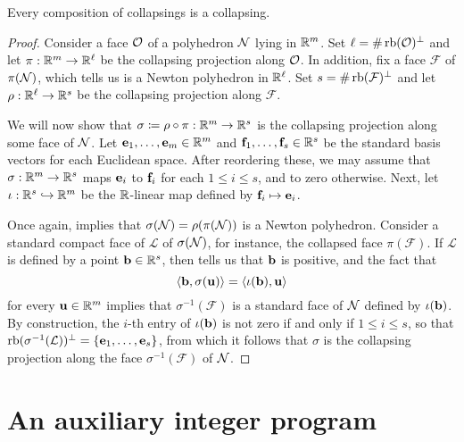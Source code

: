 \documentclass{amsart}
\begin{document}
\begin{proposition}
\label{collapse of a collapse is a collapse: P} Every composition of collapsings is a collapsing.
\end{proposition}

\begin{proof}
Consider a face $\mathcal{O}$ of a polyhedron $\mathcal{N}$ lying in $\mathbb{R}^m$.   Set $\ell = \# \operatorname{rb}(\mathcal{O})^{\perp}$ and let $\pi: \mathbb{R}^m \to \mathbb{R}^{\ell}$ be the collapsing projection along $\mathcal{O}$.  In addition, fix a face $\mathcal{F}$ of $\pi(\mathcal{N})$,  which  tells us is a Newton polyhedron in $\mathbb{R}^{\ell}$.  Set $s=\# \operatorname{rb}(\mathcal{F})^{\perp}$ and let $\rho: \mathbb{R}^{\ell} \to \mathbb{R}^s$ be the collapsing projection along $\mathcal{F}$.

We will now show that $\sigma \coloneqq \rho \circ \pi: \mathbb{R}^m \to \mathbb{R}^s$ is the collapsing projection along some face of $\mathcal{N}$.  Let $\mathbf{e}_1, \ldots, \mathbf{e}_m \in \mathbb{R}^m$ and $\mathbf{f}_1, \ldots, \mathbf{f}_s \in \mathbb{R}^s$ be the standard basis vectors for each Euclidean space.  After reordering these, we may assume that $\sigma: \mathbb{R}^m \to \mathbb{R}^s$ maps $\mathbf{e}_i$ to $\mathbf{f}_i$ for each $1 \leq i \leq s$, and to zero otherwise.   Next, let  $\iota:  \mathbb{R}^s \hookrightarrow \mathbb{R}^m$ be the $\mathbb{R}$-linear map defined by $\mathbf{f}_i \mapsto \mathbf{e}_i$.

Once again,  implies that $\sigma(\mathcal{N}) = \rho(\pi(\mathcal{N}))$ is a Newton polyhedron.  Consider a standard compact face of $\mathcal{L}$ of $\sigma(\mathcal{N})$, for instance, the collapsed face $\pi(\mathcal{F})$.    If $\mathcal{L}$ is defined by a point $\mathbf{b} \in \mathbb{R}^s$, then   tells us that $\mathbf{b}$ is positive, and the fact that
\[ \langle \mathbf{b}, \sigma(\mathbf{u}) \rangle = \langle \iota(\mathbf{b}), \mathbf{u} \rangle \] for every $\mathbf{u} \in \mathbb{R}^m$ implies that $\sigma^{-1}(\mathcal{F})$ is a standard face of $\mathcal{N}$ defined by $\iota(\mathbf{b})$.  By construction, the $i$-th entry of $\iota(\mathbf{b})$ is not zero if and only if $1 \leq i \leq s$, so that $\operatorname{rb}(\sigma^{-1}(\mathcal{L}))^{\perp} = \{ \mathbf{e}_1, \ldots, \mathbf{e}_s \}$, from which it follows that $\sigma$ is the collapsing projection along the face $\sigma^{-1}(\mathcal{F})$ of $\mathcal{N}$.
\end{proof}

\section{An auxiliary integer program}
\end{document}
